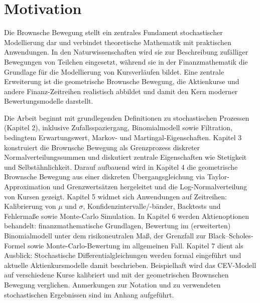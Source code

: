 \section{Motivation}

Die Brownsche Bewegung stellt ein zentrales Fundament stochastischer Modellierung dar und verbindet theoretische Mathematik mit praktischen Anwendungen.
In den Naturwissenschaften wird sie zur Beschreibung zufälliger Bewegungen von Teilchen eingesetzt, während sie in der Finanzmathematik die Grundlage für die Modellierung von Kursverläufen bildet.
Eine zentrale Erweiterung ist die geometrische Brownsche Bewegung, die Aktienkurse und andere Finanz-Zeitreihen realistisch abbildet und damit den Kern moderner Bewertungsmodelle darstellt.


Die Arbeit beginnt mit grundlegenden Definitionen zu stochastischen Prozessen (Kapitel 2), inklusive Zufallsspaziergang, Binomialmodell sowie Filtration, 
bedingtem Erwartungswert, Markov- und Martingal-Eigenschaften. Kapitel 3 konstruiert die Brownsche Bewegung 
als Grenzprozess diskreter Normalverteilungssummen und diskutiert zentrale Eigenschaften wie Stetigkeit und 
Selbstähnlichkeit. Darauf aufbauend wird in Kapitel 4 die geometrische Brownsche Bewegung aus einer diskreten Übergangsgleichung via Taylor-Approximation und Grenzwertsätzen hergeleitet und die Log-Normalverteilung von Kursen gezeigt. 
Kapitel 5 widmet sich Anwendungen auf Zeitreihen: Kalibrierung von $\mu$ und $\sigma$, 
Konfidenzintervalle/-bänder, Backtests und Fehlermaße sowie Monte-Carlo Simulation. In 
Kapitel 6 werden Aktienoptionen behandelt: finanzmathematische Grundlagen, Bewertung im 
(erweiterten) Binomialmodell unter dem risikoneutralen Maß, der Grenzfall zur Black–Scholes-Formel sowie 
Monte-Carlo-Bewertung im allgemeinen Fall. Kapitel 7 dient als Ausblick: Stochastische Differentialgleichungen werden formal eingeführt und
aktuelle Aktienkursmodelle damit beschrieben. Beispielhaft wird das CEV-Modell auf verschiedene Kurse kalibriert und mit der geometrischen
Brownschen Bewegung verglichen. Anmerkungen zur Notation und zu verwendeten stochastischen Ergebnissen sind im Anhang aufgeführt. 
